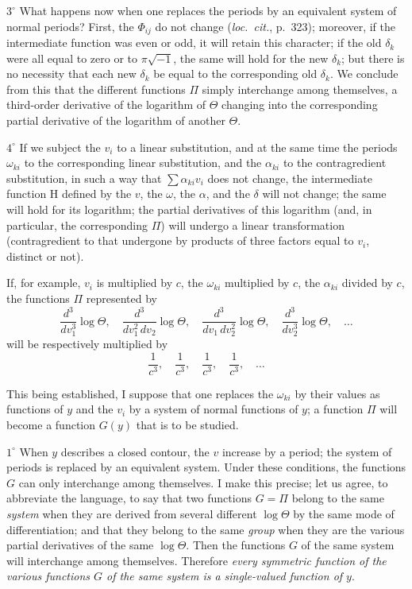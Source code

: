 \documentclass{article}
\begin{document}
$3^{\circ}$ What happens now when one replaces the periods by an equivalent system of normal periods? First, the $\Phi_{ij}$ do not change (\emph{loc.~cit.}, p.~323); moreover, if the intermediate function was even or odd, it will retain this character; if the old $\delta_{k}$ were all equal to zero or to $\pi\sqrt{-1}$, the same will hold for the new $\delta_{k}$; but there is no necessity
that each new $\delta_{k}$ be equal to the corresponding old $\delta_{k}$. We conclude from this that the different functions $\Pi$ simply interchange among themselves, a third-order derivative of the logarithm of $\Theta$ changing into the corresponding partial derivative of the logarithm of another $\Theta$.

$4^{\circ}$ If we subject the $v_{i}$ to a linear substitution, and at the same time the periods $\omega_{ki}$ to the corresponding linear substitution, and the $\alpha_{ki}$ to the contragredient substitution, in such a way that $\displaystyle\sum \alpha_{ki} v_{i}$ does not change, the intermediate function $\mathrm{H}$ defined by the $v$, the $\omega$, the $\alpha$, and the $\delta$ will not change; the same will hold for its logarithm; the partial derivatives of this logarithm (and, in particular, the corresponding $\Pi$) will undergo a linear transformation (contragredient to that undergone by products of three factors equal to $v_{i}$, distinct or not).

If, for example, $v_{i}$ is multiplied by $c$, the $\omega_{ki}$ multiplied by $c$, the $\alpha_{ki}$ divided by $c$, the functions $\Pi$ represented by
\[
\frac{d^{3}}{dv_{1}^{3}} \log\Theta, \quad \frac{d^{3}}{dv_{1}^{2}\,dv_{2}} \log\Theta, \quad \frac{d^{3}}{dv_{1}\,dv_{2}^{2}} \log\Theta, \quad \frac{d^{3}}{dv_{2}^{3}} \log\Theta, \quad \ldots
\]
will be respectively multiplied by
\[
\frac{1}{c^{3}}, \quad \frac{1}{c^{3}}, \quad \frac{1}{c^{3}}, \quad \frac{1}{c^{3}}, \quad \ldots
\]

This being established, I suppose that one replaces the $\omega_{ki}$ by their values as functions of $y$ and the $v_{i}$ by a system of normal functions of $y$; a function $\Pi$ will become a function $G(y)$ that is to be studied.

$1^{\circ}$ When $y$ describes a closed contour, the $v$ increase by a period; the system of periods is replaced by an equivalent system. Under these conditions, the functions $G$ can only interchange among themselves. I make this precise; let us agree, to abbreviate the language, to say that two functions $G = \Pi$ belong to the same \emph{system} when they are derived from several different $\log\Theta$ by the same mode of differentiation; and that they belong to the same \emph{group} when they are the various partial derivatives of the same $\log\Theta$. Then the functions $G$ of the same system will interchange among themselves. Therefore \emph{every symmetric function of the various functions $G$ of the same system is a single-valued function of $y$}.
\end{document}
